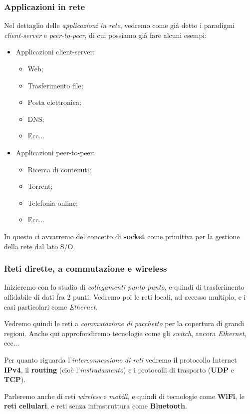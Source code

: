 \documentclass[a4paper,11pt]{article}
\begin{document}
\subsubsection{Applicazioni in rete}
Nel dettaglio delle \textit{applicazioni in rete}, vedremo come già detto i paradigmi \textit{client-server} e \textit{peer-to-peer}, di cui possiamo già fare alcuni esempi:
\begin{itemize}
	\item Applicazioni client-server:
		\begin{itemize}
			\item Web;
			\item Trasferimento file;
			\item Posta elettronica;
			\item DNS;
			\item Ecc...
		\end{itemize}
	\item Applicazioni peer-to-peer:
		\begin{itemize}
			\item Ricerca di contenuti;
			\item Torrent;
			\item Telefonia online;
			\item Ecc...
		\end{itemize}
\end{itemize}

In questo ci avvarremo del concetto di \textbf{socket} come primitiva per la gestione della rete dal lato S/O.

\subsubsection{Reti dirette, a commutazione e wireless}
Inizieremo con lo studio di \textit{collegamenti punto-punto}, e quindi di trasferimento affidabile di dati fra 2 punti.
Vedremo poi le reti locali, ad accesso multiplo, e i casi particolari come \textit{Ethernet}.

Vedremo quindi le reti a \textit{commutazione di pacchetto} per la copertura di grandi regioni. Anche qui approfondiremo tecnologie come gli \textit{switch}, ancora \textit{Ethernet}, ecc...

Per quanto riguarda l'\textit{interconnessione di reti} vedremo il protocollo Internet \textbf{IPv4}, il \textbf{routing} (cioè l'\textit{instradamento}) e i protocolli di trasporto (\textbf{UDP} e \textbf{TCP}).

Parleremo anche di reti \textit{wireless} e \textit{mobili}, e quindi di tecnologie come \textbf{WiFi}, le \textbf{reti cellulari}, e reti senza infrastruttura come \textbf{Bluetooth}.
\end{document}
